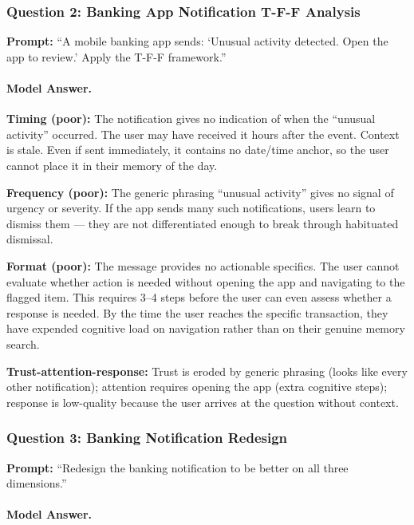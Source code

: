 \subsubsection{Question 2: Banking App Notification T-F-F Analysis}

\textbf{Prompt:} ``A mobile banking app sends: `Unusual activity detected. Open the app to review.' Apply the T-F-F framework.''

\paragraph{Model Answer.}

\textbf{Timing (poor):} The notification gives no indication of when the ``unusual activity'' occurred. The user may have received it hours after the event. Context is stale. Even if sent immediately, it contains no date/time anchor, so the user cannot place it in their memory of the day.

\textbf{Frequency (poor):} The generic phrasing ``unusual activity'' gives no signal of urgency or severity. If the app sends many such notifications, users learn to dismiss them --- they are not differentiated enough to break through habituated dismissal.

\textbf{Format (poor):} The message provides no actionable specifics. The user cannot evaluate whether action is needed without opening the app and navigating to the flagged item. This requires 3--4 steps before the user can even assess whether a response is needed. By the time the user reaches the specific transaction, they have expended cognitive load on navigation rather than on their genuine memory search.

\textbf{Trust-attention-response:} Trust is eroded by generic phrasing (looks like every other notification); attention requires opening the app (extra cognitive steps); response is low-quality because the user arrives at the question without context.

\subsubsection{Question 3: Banking Notification Redesign}

\textbf{Prompt:} ``Redesign the banking notification to be better on all three dimensions.''

\paragraph{Model Answer.}

